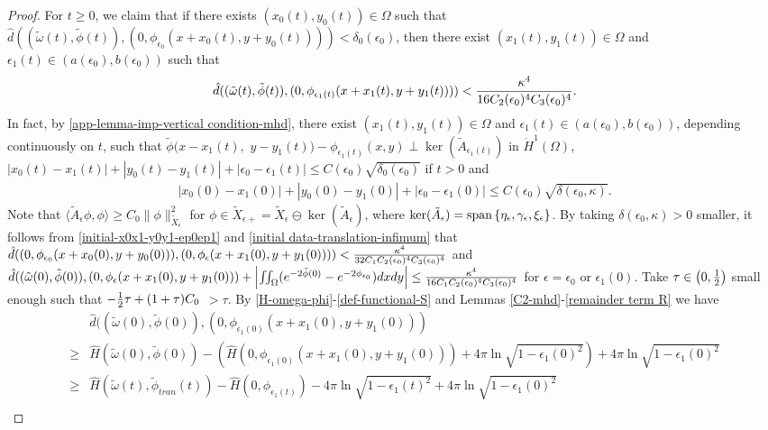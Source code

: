 \documentclass[1 [leqno, 11pt]{amsart}
\numberwithin{equation}{section}
\let\ep=\epsilon
\begin{document}
\begin{CJK*}{GBK}{song}
\begin{proof}
For $t\geq0$, we claim that if there exists $( x_0(t),y_0(t))\in\Omega$ such that
$\hat d((\tilde\omega(t),\tilde \phi(t)),(0,\phi_{\ep_0}(x+x_0(t),y+y_0(t))))<\delta_0(\ep_0)$, then there exist $(x_1(t),y_1(t))\in\Omega$ and $\ep_1(t)\in(a(\ep_0),b(\ep_0))$ such that
\begin{align}\label{a prior estimate-mhd}\hat d((\tilde\omega(t),\tilde \phi(t)),(0,\phi_{\ep_1(t)}(x+x_1(t),y+y_1(t))))
<{\kappa^4\over16C_2(\ep_0)^4C_3(\ep_0)^4}.
\end{align}
In fact, by \eqref{app-lemma-imp-vertical condition-mhd},  there exist $(x_1(t),y_1(t))\in\Omega$ and $\ep_1(t)\in(a(\ep_0),b(\ep_0))$, depending continuously on $t$, such that
$\tilde \phi(x-x_1(t),$ $y-y_1(t))-\phi_{\ep_1(t)}(x,y)\perp\ker \left(\tilde  A_{\ep_1(t)}\right)$
in $ \dot{H}^1(\Omega)$,  $|x_0(t)-x_1(t)|+|y_0(t)-y_1(t)|+|\ep_0-\ep_1(t)|\leq C(\ep_0)\sqrt{\delta_0(\ep_0)}$ if $t>0$ and
\begin{align}\label{initial-x0x1-y0y1-ep0ep1}
|x_0(0)-x_1(0)|+|y_0(0)-y_1(0)|+|\ep_0-\ep_1(0)|\leq C(\ep_0)\sqrt{\delta(\ep_0,\kappa)}.
\end{align}
Note that
$
\langle  \tilde A_\ep \phi,\phi\rangle \geq C_0 \| \phi\|_{\tilde X_\ep}^2$ for  $\phi\in \tilde X_{\ep+}=\tilde X_\ep \ominus\ker ( \tilde A_\ep)
$, where $
\ker ( \tilde A_\ep)={\rm{span}}\left\{\eta_\ep, \gamma_\ep, \xi_\ep\right\}
$.
By taking $\delta(\ep_0,\kappa)>0$ smaller, it follows from \eqref{initial-x0x1-y0y1-ep0ep1} and \eqref{initial data-translation-infimum} that  $ \hat d((0,\phi_{\ep_0}(x+x_0(0),y+y_0(0))),(0,\phi_{\ep}(x+x_1(0),y+y_1(0))))<{\kappa^4\over32C_1C_2(\ep_0)^4C_3(\ep_0)^4}$ and
$
\hat d((\tilde \omega(0),\tilde \phi(0)),(0,\phi_{\ep}(x+x_1(0),y+y_1(0)))+\left|\iint_{\Omega}(e^{-2\tilde \phi(0)}-e^{-2\phi_{\ep_0}})dxdy\right|
\leq {\kappa^4\over16C_1C_2(\ep_0)^4C_3(\ep_0)^4}
$
for $\ep=\ep_0$ or $\ep_1(0)$.
Take $\tau\in\left(0,{1\over2}\right)$ small enough such that  $-{1\over2}\tau+(1+\tau)C_0$ $>\tau$.
By \eqref{H-omega-phi}-\eqref{def-functional-S} and Lemmas \ref{C2-mhd}-\ref{remainder term R} we have
\begin{align}\nonumber
& \hat d((\tilde \omega(0),\tilde \phi(0)),(0,\phi_{\ep_1(0)}(x+x_1(0),y+y_1(0)))\\\nonumber
\geq&\hat H(\tilde \omega(0),\tilde \phi(0))-\left(\hat H( 0, \phi_{\ep_1(0)}(x+x_1(0),y+y_1(0)))+4\pi\ln\sqrt{1-\ep_1(0)^2}\right)+4\pi\ln\sqrt{1-\ep_1(0)^2}\\\nonumber
 \geq& \hat H(\tilde \omega(t),\tilde \phi_{tran}(t))-\hat H( 0, \phi_{\ep_1(t)})-4\pi\ln\sqrt{1-\ep_1(t)^2}+4\pi\ln\sqrt{1-\ep_1(0)^2}\\\nonumber

\end{align}
\end{proof}
\end{CJK*}
\end{document}
